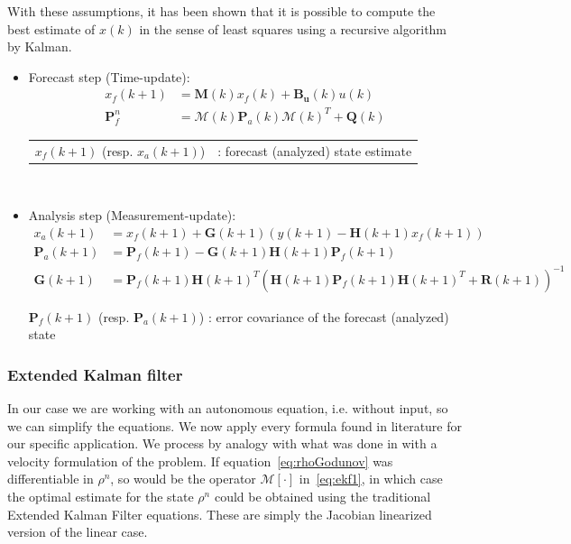 \documentclass[letterpaper,10pt]{article}
\begin{document}
With these assumptions, it has been shown that it is possible to compute the best estimate of $x(k)$ in the sense of least squares using a recursive algorithm by Kalman. 
\begin{itemize}\label{KF_lin_hyp}
\item Forecast step (Time-update): \begin{align}
x_{f}(k+1) & =\mathbf{M}(k)x_f(k) + \mathbf{B_u}(k)u(k)\\
\mathbf{P}_{f}^{n} &
=\mathcal{M}(k)\mathbf{P}_{a}(k)\mathcal{M}(k)^{T}
+\mathbf{Q}(k)\label{eq:kf2}\end{align}
\hspace{10 mm}
\begin{tabular}{ll}
$x_{f}(k+1)$ (resp. $x_{a}(k+1)$) &: forecast (analyzed) state estimate\\
\end{tabular}\\

\item Analysis step (Measurement-update): \begin{align}
x_{a}(k+1) &
=x_{f}(k+1)+\mathbf{G}(k+1)\left(y(k+1)-\mathbf{H}(k+1)x_{f}(k+1)\right)\\
\mathbf{P}_{a}(k+1)&
=\mathbf{P}_{f}(k+1)-\mathbf{G}(k+1)\mathbf{H}(k+1)\mathbf{P}_{f}(k+1)\\
\mathbf{G}(k+1) &
=\mathbf{P}_{f}(k+1)\mathbf{H}(k+1)^{T}\left(\mathbf{H}(k+1)\mathbf{P}
_{f}(k+1)\mathbf{H}(k+1)^{T}+\mathbf{R}(k+1)\right)^{-1}\label{
eq:kalmangain}\end{align}

$\mathbf{P}_{f}(k+1)$ (resp. $\mathbf{P}_{a}(k+1)$) : error covariance of the forecast (analyzed) state

\end{itemize} 

\subsubsection{Extended Kalman filter}\label{Ext_Kal_v}
In our case we are working with an autonomous equation, i.e. without input, so we can simplify the equations. We now apply every formula found in literature for our specific application. We process by analogy with what was done in \cite{} with a velocity formulation of the problem. If equation~\eqref{eq:rhoGodunov} was differentiable in $\rho^{n}$,
so would be the operator $\mathcal{M}[\cdot]$ in~\eqref{eq:ekf1},
in which case the optimal estimate for the state $\rho^{n}$ could be
obtained using the traditional Extended Kalman Filter
equations. These are simply the Jacobian linearized version of the linear case.
\end{document}
